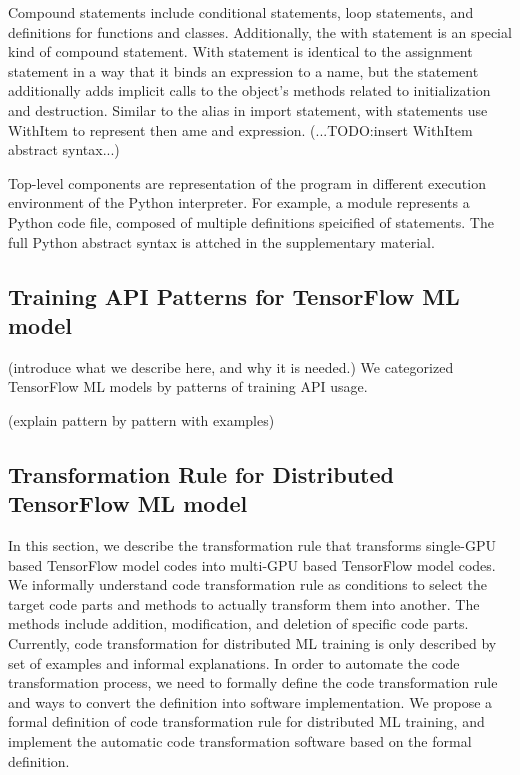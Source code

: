 Compound statements include conditional statements, loop statements,
and definitions for functions and classes.
Additionally, the with statement is an special kind of compound statement.
With statement is identical to the assignment statement 
in a way that it binds an expression to a name, 
but the statement additionally adds implicit calls
to the object's methods related to initialization and destruction.
Similar to the alias in import statement,
with statements use WithItem to represent then ame and expression.
(...TODO:insert WithItem abstract syntax...) 

Top-level components are representation of the program
in different execution environment of the Python interpreter.
For example, a module represents a Python code file, composed of
multiple definitions speicified of statements. 
The full Python abstract syntax is attched in the supplementary material.

\subsection{Training API Patterns for TensorFlow ML model}

(introduce what we describe here, and why it is needed.)
We categorized TensorFlow ML models by patterns of training API usage.

(explain pattern by pattern with examples)

\subsection{Transformation Rule for Distributed TensorFlow ML model}

In this section, we describe the transformation rule that
transforms single-GPU based TensorFlow model codes into
multi-GPU based TensorFlow model codes.
We informally understand code transformation rule as
conditions to select the target code parts
and methods to actually transform them into another.
The methods include addition, modification, and deletion of
specific code parts.
Currently, code transformation for distributed ML training
is only described by set of examples and informal explanations.
In order to automate the code transformation process,
we need to formally define the code transformation rule
and ways to convert the definition into software implementation.
We propose a formal definition of code transformation rule
for distributed ML training, and implement the automatic code transformation
software based on the formal definition.

